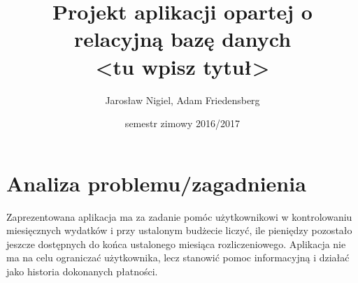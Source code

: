 \documentclass{article}
\title{\textbf{Projekt aplikacji opartej o relacyjną bazę danych} \\ 
\normalsize{<tu wpisz tytuł>}}
\author{Jarosław Nigiel, Adam Friedensberg}
\date{semestr zimowy 2016/2017}
\begin{document}
	\maketitle
    
    \tableofcontents
    
    \section{Analiza problemu/zagadnienia}
    Zaprezentowana aplikacja ma za zadanie pomóc użytkownikowi w 
kontrolowaniu miesięcznych wydatków i przy ustalonym budżecie liczyć, 
ile pieniędzy pozostało jeszcze dostępnych do końca ustalonego miesiąca 
rozliczeniowego. Aplikacja nie ma na celu ograniczać użytkownika, lecz 
stanowić pomoc informacyjną i działać jako historia dokonanych 
płatności.
    
\end{document}
